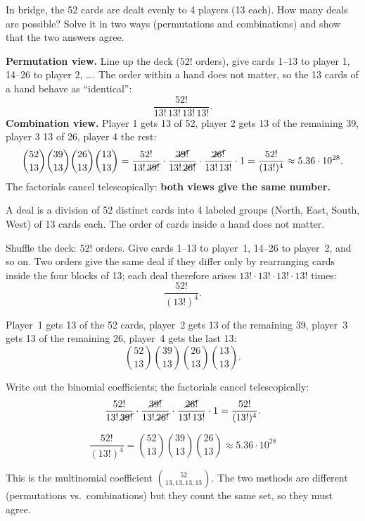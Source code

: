 
\begin{problem}
	In bridge, the 52 cards are dealt evenly to 4 players (13 each). How many
	deals are possible? Solve it in two ways (permutations and combinations)
	and show that the two answers agree.
\end{problem}

\begin{slides}
	\small
	\exstatement
	\pause
	\sol \textbf{Permutation view.} Line up the deck ($52!$ orders), give cards
	1--13 to player 1, 14--26 to player 2, \ldots. The order within a hand does
	not matter, so the 13 cards of a hand behave as ``identical'':
	\[ \frac{52!}{13!\,13!\,13!\,13!}. \]
	\vspace{-1mm}\textbf{Combination view.} Player 1 gets 13 of 52, player 2 gets 13 of the
	remaining 39, player 3 13 of 26, player 4 the rest:
	\[ \binom{52}{13}\binom{39}{13}\binom{26}{13}\binom{13}{13}
		= \frac{52!}{13!\,\cancel{39!}}\cdot\frac{\cancel{39!}}{13!\,\cancel{26!}}
		\cdot\frac{\cancel{26!}}{13!\,13!}\cdot 1
		= \frac{52!}{(13!)^4}\approx 5.36\cdot 10^{28}. \]
	The factorials cancel telescopically: \textbf{both views give the same
		number.}
\end{slides}

\begin{solution}
	\idea A deal is a division of 52 distinct cards into 4 labeled groups
	(North, East, South, West) of 13 cards each. The order of cards inside a
	hand does not matter.

	 Shuffle the deck: $52!$ orders. Give cards 1--13 to
	player~1, 14--26 to player~2, and so on. Two orders give the same deal if
	they differ only by rearranging cards inside the four blocks of 13; each
	deal therefore arises $13!\cdot13!\cdot13!\cdot13!$ times:
	\[ \frac{52!}{(13!)^4}. \]

	 Player~1 gets 13 of the 52 cards, player~2 gets 13
	of the remaining 39, player~3 gets 13 of the remaining 26, player~4 gets the
	last 13:
	\[ \binom{52}{13}\binom{39}{13}\binom{26}{13}\binom{13}{13}. \]

	 Write out the binomial coefficients; the factorials cancel
	telescopically:
	\[ \frac{52!}{13!\,\cancel{39!}}\cdot\frac{\cancel{39!}}{13!\,\cancel{26!}}
		\cdot\frac{\cancel{26!}}{13!\,13!}\cdot1=\frac{52!}{(13!)^4}. \]
	\begin{answer}
		\[ \frac{52!}{(13!)^4}=\binom{52}{13}\binom{39}{13}\binom{26}{13}
			\approx5.36\cdot10^{28} \]
	\end{answer}
	\begin{remark}
		This is the multinomial coefficient $\binom{52}{13,13,13,13}$. The two
		methods are different (permutations vs.\ combinations) but they count the
		same set, so they must agree.
	\end{remark}
\end{solution}
